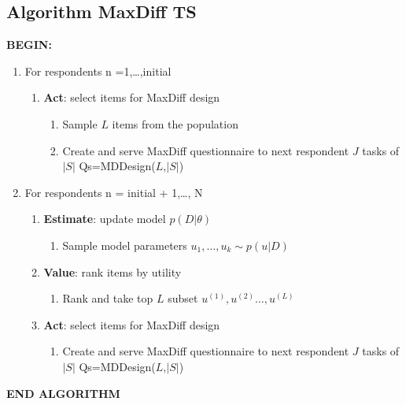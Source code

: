 \documentclass[nonblindrev]{informs3}
\begin{document}
\subsection{Algorithm MaxDiff TS}
\textbf{BEGIN:}
\begin{enumerate}
\item For respondents n =1,\ldots,initial
\begin{enumerate}
\item \textbf{Act}: select items for MaxDiff design
\begin{enumerate}
\item Sample $L$ items from the population 
\item Create and serve MaxDiff questionnaire to next respondent $J$ tasks of $|S|$ Qs=MDDesign($L$,$|S|$)
\end{enumerate}
\end{enumerate}
\item For respondents n = initial + 1,\ldots, N
\begin{enumerate}
\item \textbf{Estimate}: update model $p(D|\theta)$
\begin{enumerate}
\item Sample model parameters $u_1,\ldots,u_k \sim p(u|D)$
\end{enumerate}
\item \textbf{Value}: rank items by utility
\begin{enumerate}
\item Rank and take top $L$ subset $u^{(1)},u^{(2)}\ldots,u^{(L)}$
\end{enumerate}
\item \textbf{Act}: select items for MaxDiff design
\begin{enumerate}
\item Create and serve MaxDiff questionnaire to next respondent $J$ tasks of $|S|$ Qs=MDDesign($L$,$|S|$)
\end{enumerate}
\end{enumerate}
\end{enumerate}
\textbf{END ALGORITHM}
\end{document}
